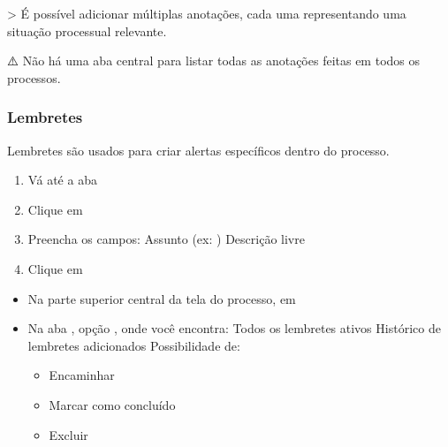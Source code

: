 \documentclass[letterpaper,10pt,brazil]{sphinxmanual}
\begin{document}
\sphinxAtStartPar
\textgreater{} É possível adicionar múltiplas anotações, cada uma representando uma situação processual relevante.

\sphinxAtStartPar
⚠️  Não há uma aba central para listar todas as anotações feitas em todos os processos.


\subsubsection{Lembretes}
\label{\detokenize{projud_12_favoritar:lembretes}}
\sphinxAtStartPar
Lembretes são usados para criar alertas específicos dentro do processo.

\sphinxAtStartPar
{}
\begin{enumerate}
%
\item {} 
\sphinxAtStartPar
Vá até a aba 

\item {} 
\sphinxAtStartPar
Clique em 

\item {} 
\sphinxAtStartPar
Preencha os campos:
\sphinxhyphen{} Assunto (ex: )
\sphinxhyphen{} Descrição livre

\item {} 
\sphinxAtStartPar
Clique em 

\end{enumerate}

\sphinxAtStartPar
{}
\begin{itemize}
\item {} 
\sphinxAtStartPar
Na parte superior central da tela do processo, em 

\item {} 
\sphinxAtStartPar
Na aba , opção , onde você encontra:
\sphinxhyphen{} Todos os lembretes ativos
\sphinxhyphen{} Histórico de lembretes adicionados
\sphinxhyphen{} Possibilidade de:
\begin{itemize}
\item {} 
\sphinxAtStartPar
Encaminhar

\item {} 
\sphinxAtStartPar
Marcar como concluído

\item {} 
\sphinxAtStartPar
Excluir

\end{itemize}

\end{itemize}
\end{document}
